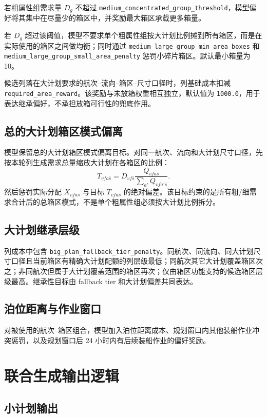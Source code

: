 \documentclass[UTF8,a4paper,11pt]{ctexart}
\newcommand{\code}[1]{\nolinkurl{#1}}
\begin{document}
若粗属性组需求量 \(D_g\) 不超过 \code{medium_concentrated_group_threshold}，模型偏好将其集中在尽量少的箱区中，并奖励最大箱区承载更多箱量。

若 \(D_g\) 超过该阈值，模型不要求单个粗属性组按大计划比例摊到所有箱区，而是在实际使用的箱区之间做均衡；同时通过 \code{medium_large_group_min_area_boxes} 和 \code{medium_large_group_small_area_penalty} 惩罚小碎片箱区。默认最小箱量为 10。

候选列落在大计划要求的航次--流向--箱区--尺寸口径时，列基础成本扣减 \code{required_area_reward}。该奖励与未放箱权重相互独立，默认值为 \code{1000.0}，用于表达继承偏好，不承担放箱可行性的兜底作用。

\subsection{总的大计划箱区模式偏离}

模型保留总的大计划箱区模式偏离目标。对同一航次、流向和大计划尺寸口径，先按本轮列生成需求总量缩放大计划在各箱区的比例：
\[
T_{vfa\bar{s}}
=D_{vf\bar{s}}
\frac{Q_{vfa\bar{s}}}{\sum_{a'}Q_{vfa'\bar{s}}}.
\]
然后惩罚实际分配 \(X_{vfa\bar{s}}\) 与目标 \(T_{vfa\bar{s}}\) 的绝对偏差。该目标约束的是所有粗/细需求合计后的总箱区模式，不是单个粗属性组必须按大计划比例拆分。

\subsection{大计划继承层级}

列成本中包含 \code{big_plan_fallback_tier_penalty}。同航次、同流向、同大计划尺寸口径且当前箱区有精确大计划配额的列层级最低；同航次其它大计划覆盖箱区次之；非同航次但属于大计划覆盖范围的箱区再次；仅由箱区功能支持的候选箱区层级最高。继承性目标由 fallback tier 和大计划偏差共同表达。

\subsection{泊位距离与作业窗口}

对被使用的航次--箱区组合，模型加入泊位距离成本、规划窗口内其他装船作业冲突惩罚，以及规划窗口后 24 小时内有后续装船作业的偏好奖励。

\section{联合生成输出逻辑}

\subsection{小计划输出}
\end{document}
